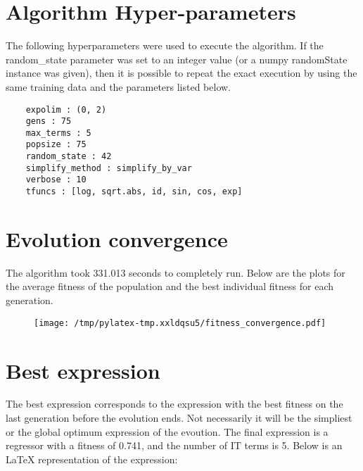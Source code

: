 \documentclass{article}%
\begin{document}
%
\vfill \pagebreak

%
\section*{Algorithm Hyper-parameters}%
\label{sec:AlgorithmHyper{-}parameters}%

                The following hyperparameters were used to execute the
                algorithm. If the random\_state parameter was set to an 
                integer value (or a numpy randomState instance was given), then
                it is possible to repeat the exact execution by using the same
                training data and the parameters listed below.%
{\footnotesize \begin{verbatim}    expolim : (0, 2)
    gens : 75
    max_terms : 5
    popsize : 75
    random_state : 42
    simplify_method : simplify_by_var
    verbose : 10
    tfuncs : [log, sqrt.abs, id, sin, cos, exp]\end{verbatim} } \vfill \pagebreak

%

            \chead{}
            \rhead{\today, \currenttime}
            
            \lfoot{}
            \cfoot{}
            \rfoot{\thepage\ | \pageref{LastPage}}
\section*{Evolution convergence}%
\label{sec:Evolutionconvergence}%

                The algorithm took 331.013 seconds to
                completely run. Below are the plots for the average fitness
                of the population and the best individual fitness for each
                generation.\vfill%


\begin{figure}[H]%
\centering%
\texttt{[image: /tmp/pylatex-tmp.xxldqsu5/fitness\_convergence.pdf]}%
\end{figure}

%
\vfill \pagebreak

%
\section*{Best expression}%
\label{sec:Bestexpression}%

                The best expression corresponds to the expression with
                the best fitness on the last generation before the evolution
                ends. Not necessarily it will be the simpliest or the global
                optimum expression of the evoution. The final expression is a regressor with a fitness of
                0.741, and the number of IT terms is
                5. Below is an LaTeX representation
                of the expression:
                
\end{document}
